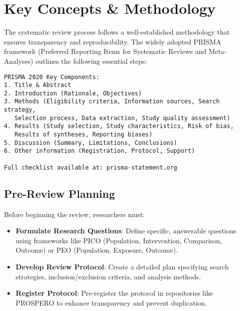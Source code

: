 \section{Key Concepts \& Methodology}

The systematic review process follows a well-established methodology that ensures transparency and reproducibility. The widely adopted PRISMA framework (Preferred Reporting Items for Systematic Reviews and Meta-Analyses) outlines the following essential steps:

\begin{configbox}
\begin{lstlisting}
PRISMA 2020 Key Components:
1. Title & Abstract
2. Introduction (Rationale, Objectives)
3. Methods (Eligibility criteria, Information sources, Search strategy,
   Selection process, Data extraction, Study quality assessment)
4. Results (Study selection, Study characteristics, Risk of bias,
   Results of syntheses, Reporting biases)
5. Discussion (Summary, Limitations, Conclusions)
6. Other information (Registration, Protocol, Support)

Full checklist available at: prisma-statement.org
\end{lstlisting}
\end{configbox}

\subsection{Pre-Review Planning}

Before beginning the review, researchers must:

\begin{itemize}
    \item \textbf{Formulate Research Questions}: Define specific, answerable questions using frameworks like PICO (Population, Intervention, Comparison, Outcome) or PEO (Population, Exposure, Outcome).
    \item \textbf{Develop Review Protocol}: Create a detailed plan specifying search strategies, inclusion/exclusion criteria, and analysis methods.
    \item \textbf{Register Protocol}: Pre-register the protocol in repositories like PROSPERO to enhance transparency and prevent duplication.
\end{itemize}


